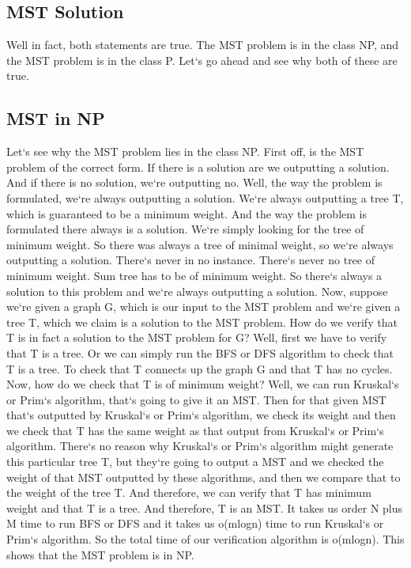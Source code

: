 \subsection{MST Solution}
Well in fact, both statements are true.
The MST problem is in the class NP, and the MST problem is in the class P\@.
Let`s go ahead and see why both of these are true.

\subsection{MST in NP}
Let`s see why the MST problem lies in the class NP\@.
First off, is the MST problem of the correct form.
If there is a solution are we outputting a solution.
And if there is no solution, we`re outputting no.
Well, the way the problem is formulated, we`re always outputting a solution.
We`re always outputting a tree T, which is guaranteed to be a minimum weight.
And the way the problem is formulated there always is a solution.
We`re simply looking for the tree of minimum weight.
So there was always a tree of minimal weight, so we`re always outputting a solution.
There`s never in no instance.
There`s never no tree of minimum weight.
Sum tree has to be of minimum weight.
So there`s always a solution to this problem and we`re always outputting a solution.
Now, suppose we`re given a graph G, which is our input to the MST problem and we`re given a tree T, which we claim is a solution to the MST problem.
How do we verify that T is in fact a solution to the MST problem for G? Well, first we have to verify that T is a tree.
Or we can simply run the BFS or DFS algorithm to check that T is a tree.
To check that T connects up the graph G and that T has no cycles.
Now, how do we check that T is of minimum weight? Well, we can run Kruskal`s or Prim`s algorithm, that`s going to give it an MST\@.
Then for that given MST that`s outputted by Kruskal`s or Prim`s algorithm, we check its weight and then we check that T has the same weight as that output from Kruskal`s or Prim`s algorithm.
There`s no reason why Kruskal`s or Prim`s algorithm might generate this particular tree T, but they`re going to output a MST and we checked the weight of that MST outputted by these algorithms, and then we compare that to the weight of the tree T\@.
And therefore, we can verify that T has minimum weight and that T is a tree.
And therefore, T is an MST\@.
It takes us order N plus M time to run BFS or DFS and it takes us o(mlogn) time to run Kruskal`s or Prim`s algorithm.
So the total time of our verification algorithm is o(mlogn).
This shows that the MST problem is in NP\@.

